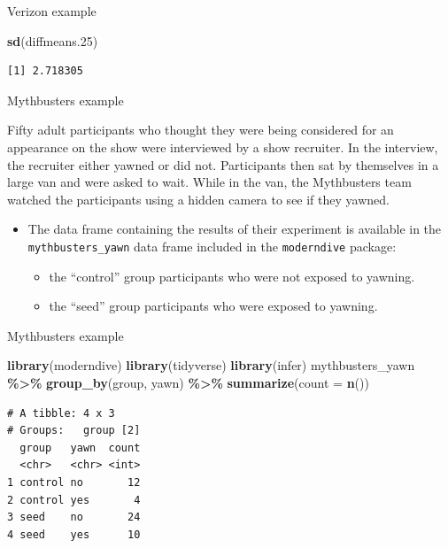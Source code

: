 \documentclass[
  ignorenonframetext,
]{beamer}
\newenvironment{Shaded}{\begin{snugshade}}{\end{snugshade}}
\newcommand{\AttributeTok}[1]{\textcolor[rgb]{0.13,0.29,0.53}{#1}}
\newcommand{\FloatTok}[1]{\textcolor[rgb]{0.00,0.00,0.81}{#1}}
\newcommand{\FunctionTok}[1]{\textcolor[rgb]{0.13,0.29,0.53}{\textbf{#1}}}
\newcommand{\NormalTok}[1]{#1}
\newcommand{\SpecialCharTok}[1]{\textcolor[rgb]{0.81,0.36,0.00}{\textbf{#1}}}
\providecommand{\tightlist}{%
  \setlength{\itemsep}{0pt}\setlength{\parskip}{0pt}}
\begin{document}
\begin{frame}[fragile]{Verizon example}
\begin{Shaded}
\begin{Highlighting}[]
\FunctionTok{sd}\NormalTok{(diffmeans}\FloatTok{.25}\NormalTok{)}
\end{Highlighting}
\end{Shaded}

\begin{verbatim}
[1] 2.718305
\end{verbatim}

\normalsize
\end{frame}

\begin{frame}[fragile]{Mythbusters example}
\protect\hypertarget{mythbusters-example}{}
\begin{tcolorbox}
Fifty adult participants who thought they were being considered for an appearance on the show were interviewed by a show recruiter. In the interview, the recruiter either yawned or did not. Participants then sat by themselves in a large van and were asked to wait. While in the van, the Mythbusters team watched the participants using a hidden camera to see if they yawned. 
\end{tcolorbox}

\begin{itemize}
\item
  The data frame containing the results of their experiment is available
  in the \texttt{mythbusters\_yawn} data frame included in the
  \texttt{moderndive} package:

  \begin{itemize}
  \tightlist
  \item
    the ``control'' group participants who were not exposed to yawning.
  \item
    the ``seed'' group participants who were exposed to yawning.
  \end{itemize}
\end{itemize}
\end{frame}

\begin{frame}[fragile]{Mythbusters example}
\protect\hypertarget{mythbusters-example-1}{}
\small

\begin{Shaded}
\begin{Highlighting}[]
\FunctionTok{library}\NormalTok{(moderndive)}
\FunctionTok{library}\NormalTok{(tidyverse)}
\FunctionTok{library}\NormalTok{(infer)}
\NormalTok{mythbusters\_yawn }\SpecialCharTok{\%\textgreater{}\%} 
  \FunctionTok{group\_by}\NormalTok{(group, yawn) }\SpecialCharTok{\%\textgreater{}\%} 
  \FunctionTok{summarize}\NormalTok{(}\AttributeTok{count =} \FunctionTok{n}\NormalTok{())}
\end{Highlighting}
\end{Shaded}

\begin{verbatim}
# A tibble: 4 x 3
# Groups:   group [2]
  group   yawn  count
  <chr>   <chr> <int>
1 control no       12
2 control yes       4
3 seed    no       24
4 seed    yes      10
\end{verbatim}

\normalsize
\end{frame}
\end{document}
